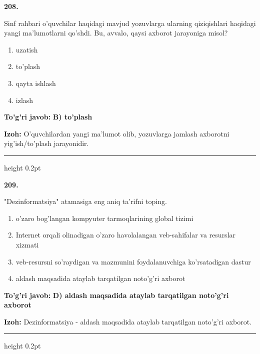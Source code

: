 \documentclass[10pt,a4paper,oneside]{article}
\begin{document}
\noindent\textbf{\color{ink}208.}
\par
Sinf rahbari o'quvchilar haqidagi mavjud yozuvlarga ularning qiziqishlari haqidagi yangi ma'lumotlarni qo'shdi. Bu, avvalo, qaysi axborot jarayoniga misol?
\begin{enumerate}[label=\Alph*),leftmargin=9mm]
\item uzatish
\item to'plash
\item qayta ishlash
\item izlash
\end{enumerate}
\begin{tcolorbox}[enhanced,breakable,colback=teal!4,colframe=teal!50!black,boxrule=0.5pt,arc=1.1mm,left=3mm,right=3mm,top=1.7mm,bottom=1.7mm,before skip=2mm,after skip=2mm]
\textbf{\color{teal}To'g'ri javob:} \textbf{B) to'plash}
\par\smallskip
\textbf{Izoh:} O'quvchilardan yangi ma'lumot olib, yozuvlarga jamlash axborotni yig'ish/to'plash jarayonidir.
\end{tcolorbox}
\vspace{2mm}\hrule height 0.2pt \vspace{3mm}

\noindent\textbf{\color{ink}209.}
\par
"Dezinformatsiya" atamasiga eng aniq ta'rifni toping.
\begin{enumerate}[label=\Alph*),leftmargin=9mm]
\item o'zaro bog'langan kompyuter tarmoqlarining global tizimi
\item Internet orqali olinadigan o'zaro havolalangan veb-sahifalar va resurslar xizmati
\item veb-resursni so'raydigan va mazmunini foydalanuvchiga ko'rsatadigan dastur
\item aldash maqsadida ataylab tarqatilgan noto'g'ri axborot
\end{enumerate}
\begin{tcolorbox}[enhanced,breakable,colback=teal!4,colframe=teal!50!black,boxrule=0.5pt,arc=1.1mm,left=3mm,right=3mm,top=1.7mm,bottom=1.7mm,before skip=2mm,after skip=2mm]
\textbf{\color{teal}To'g'ri javob:} \textbf{D) aldash maqsadida ataylab tarqatilgan noto'g'ri axborot}
\par\smallskip
\textbf{Izoh:} Dezinformatsiya - aldash maqsadida ataylab tarqatilgan noto'g'ri axborot.
\end{tcolorbox}
\vspace{2mm}\hrule height 0.2pt \vspace{3mm}
\end{document}

